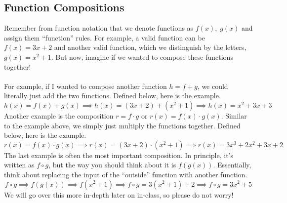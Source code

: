 \subsection{Function Compositions}
Remember from function notation that we denote functions as $f(x), \;g(x)$ and assign them ``function'' rules. For example, a valid function can be $f(x) = 3x + 2$ and another valid function, which we distinguish by the letters, $g(x) = x^2 + 1$. But now, imagine if we wanted to compose these functions together!\\
\\
For example, if I wanted to compose another function $h = f+g$, we could literally just add the two functions. Defined below, here is the example. 
$$
h(x) = f(x) + g(x) \implies h(x) = (3x + 2) + (x^2 + 1) \implies h(x) = x^2 + 3x + 3
$$
Another example is the composition $r = f \cdot g$ or $r(x) = f(x) \cdot g(x)$. Similar to the example above, we simply just multiply the functions together. Defined below, here is the example.
$$
r(x) = f(x) \cdot g(x) \implies r(x) = (3x+2) \cdot (x^2 + 1) \implies r(x) = 3x^3 + 2x^2 + 3x + 2
$$
The last example is often the most important composition. In principle, it's written as $f \circ g$, but the way you should think about it is $f\left(g(x)\right)$. Essentially, think about replacing the input of the ``outside'' function with another function. 
$$
f \circ g \implies f\left(g(x)\right) \implies f(x^2 + 1) \implies f \circ g = 3(x^2 + 1) + 2 \implies f \circ g = 3x^2 + 5
$$
We will go over this more in-depth later on in-class, so please do not worry!

